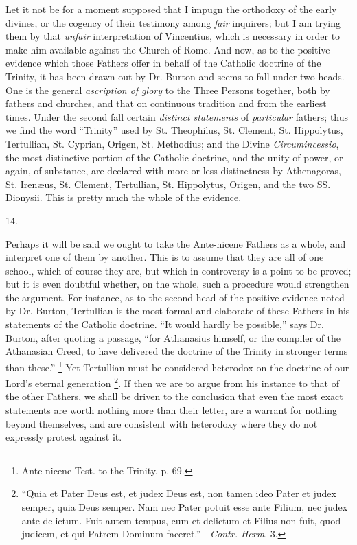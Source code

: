Let it not be for a moment supposed that I impugn the
orthodoxy of the early divines, or the cogency of their
testimony among \emph{fair} inquirers; but I am trying
them by that \emph{unfair} interpretation of Vincentius,
which is necessary in order to make him available against
the Church of Rome. And now, as to the positive evidence
which those Fathers offer in behalf of the Catholic
doctrine of the Trinity, it has been drawn out by Dr.
Burton and seems to fall under two heads. One is the
general \emph{ascription of glory} to the Three Persons
together, both by fathers and churches, and that on
continuous tradition and from the earliest times. Under
the second fall certain \emph{distinct statements} of \emph{particular}
fathers; thus we find the word ``Trinity'' used
by St. Theophilus, St. Clement, St. Hippolytus,
Tertullian, St. Cyprian, Origen, St. Methodius; and the
Divine \emph{Circumincessio}, the most distinctive
portion of the Catholic doctrine, and the unity of power,
or again, of substance, are declared with more or less
distinctness by Athenagoras, St. Irenæus, St. Clement,
Tertullian, St. Hippolytus, Origen, and the two SS.
Dionysii. This is pretty much the whole of the evidence.

14.

Perhaps it will be said we ought to take the
Ante-nicene Fathers as a whole, and interpret one of them
by another. This is to assume that they are all of one
school, which of course they are, but which in
controversy is a point to be proved; but it is even
doubtful whether, on the whole, such a procedure would
strengthen the argument. For instance, as to the second
head of the positive evidence noted by Dr. Burton,
Tertullian is the most formal and elaborate of these
Fathers in his statements of the Catholic doctrine.
``It would hardly be possible,'' says Dr. Burton,
after quoting a passage, ``for Athanasius himself, or
the compiler of the Athanasian Creed, to have delivered
the doctrine of the Trinity in stronger terms than
these.'' \footnote{Ante-nicene Test. to the
Trinity, p. 69.} Yet Tertullian must be considered heterodox on
the doctrine of our Lord's eternal generation \footnote{``Quia et Pater Deus est,
et judex Deus est, non tamen ideo Pater et judex semper,
quia Deus semper. Nam nec Pater potuit esse ante Filium,
nec judex ante delictum. Fuit autem tempus, cum et
delictum et Filius non fuit, quod judicem, et qui Patrem
Dominum faceret.''—\emph{Contr. Herm}. 3.}. If
then we are to argue from his instance to that of the
other Fathers, we shall be driven to the conclusion that
even the most exact statements are worth nothing more
than their letter, are a warrant for nothing beyond
themselves, and are consistent with heterodoxy where they
do not expressly protest against it.

